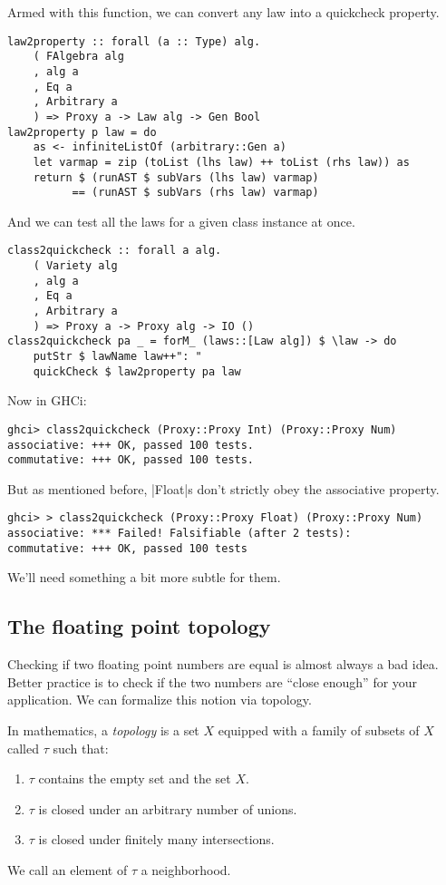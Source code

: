 \documentclass[preprint]{sigplanconf}
\theoremstyle{definition}
\begin{document}
Armed with this function, we can convert any law into a quickcheck property.
\begin{lstlisting}
law2property :: forall (a :: Type) alg.
    ( FAlgebra alg
    , alg a
    , Eq a
    , Arbitrary a
    ) => Proxy a -> Law alg -> Gen Bool
law2property p law = do
    as <- infiniteListOf (arbitrary::Gen a)
    let varmap = zip (toList (lhs law) ++ toList (rhs law)) as
    return $ (runAST $ subVars (lhs law) varmap)
          == (runAST $ subVars (rhs law) varmap)
\end{lstlisting}
And we can test all the laws for a given class instance at once.
\begin{lstlisting}
class2quickcheck :: forall a alg.
    ( Variety alg
    , alg a
    , Eq a
    , Arbitrary a
    ) => Proxy a -> Proxy alg -> IO ()
class2quickcheck pa _ = forM_ (laws::[Law alg]) $ \law -> do
    putStr $ lawName law++": "
    quickCheck $ law2property pa law
\end{lstlisting}
Now in GHCi:
\begin{lstlisting}
ghci> class2quickcheck (Proxy::Proxy Int) (Proxy::Proxy Num)
associative: +++ OK, passed 100 tests.
commutative: +++ OK, passed 100 tests.
\end{lstlisting}
But as mentioned before, |Float|s don't strictly obey the associative property.
\begin{lstlisting}
ghci> > class2quickcheck (Proxy::Proxy Float) (Proxy::Proxy Num)
associative: *** Failed! Falsifiable (after 2 tests):
commutative: +++ OK, passed 100 tests
\end{lstlisting}
We'll need something a bit more subtle for them.

\subsection{The floating point topology}

Checking if two floating point numbers are equal is almost always a bad idea.
Better practice is to check if the two numbers are ``close enough'' for your application.
We can formalize this notion via topology.

In mathematics, a \emph{topology} is a set $X$ equipped with a family of subsets of $X$ called $\tau$ such that:
\begin{enumerate}
\item
$\tau$ contains the empty set and the set $X$.
\item
$\tau$ is closed under an arbitrary number of unions.
\item
$\tau$ is closed under finitely many intersections.
\end{enumerate}
We call an element of $\tau$ a neighborhood.
\end{document}

